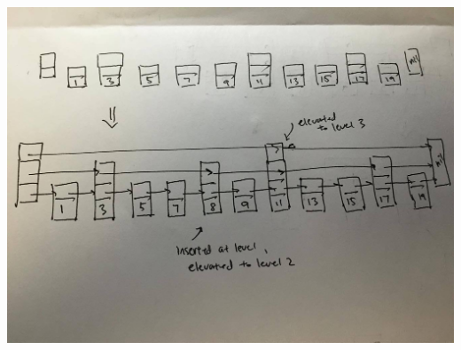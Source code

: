 \documentclass{article}
\theoremstyle{casestyle}
\begin{document}
\begin{enumerate}[i]
\begin{enumerate}[i]
    \includegraphics[scale=.3]{4iv}


  \end{enumerate}
\end{enumerate}
\end{document}

